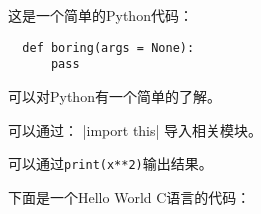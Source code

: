 \documentclass{ctexart}
\begin{document}
 
这是一个简单的Python代码：
\begin{verbatim}
  def boring(args = None):
      pass
\end{verbatim}
可以对Python有一个简单的了解。

可以通过：
|import this|
导入相关模块。

可以通过\texttt{print(x**2)}输出结果。

下面是一个Hello World C语言的代码：
\inputminted{c}{helloworld.c}
\end{document}
